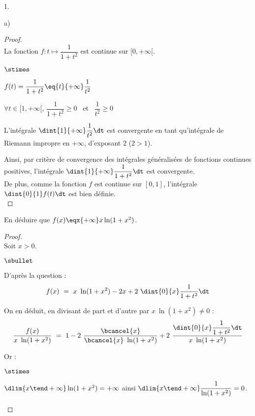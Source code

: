 \begin{noliste}{1.}
\begin{noliste}{a)}
    \begin{proof}~\\%
      La fonction $f : t \mapsto \dfrac{1}{1 + t^2}$ est continue sur
      $[0, +\infty[$.
      \begin{noliste}{$\stimes$}
      \item $f(t) = \dfrac{1}{1 + t^2} \eq{t}{+\infty}
        \dfrac{1}{t^2}$
        
      \item $\forall t \in [1, +\infty[$, $\dfrac{1}{1 + t^2} \geq
        0$ \ et \ $\dfrac{1}{t^2} \geq 0$
        
      \item L'intégrale $\dint{1}{+\infty} \dfrac{1}{t^2} \dt$ est
        convergente en tant qu'intégrale de Riemann impropre en
        $+\infty$, d'exposant $2$ ($2 > 1$).          
      \end{noliste}
      Ainsi, par critère de convergence des intégrales généralisées
      de fonctions continues positives, l'intégrale
      $\dint{1}{+\infty} \dfrac{1}{1+t^2} \dt$ est convergente.\\
      De plus, comme la fonction $f$ est continue sur $[0, 1]$,
      l'intégrale $\dint{0}{1} f(t) \dt$ est bien définie.%
      ~\\[-.8cm]
    \end{proof}
    
  \item En déduire que $f(x) \eqx{+\infty} x \ln(1 + x^2)$.

    \begin{proof}~\\%
      Soit $x > 0$.
      \begin{noliste}{$\sbullet$}
      \item D'après la question  :
        \[
        f(x) \ = \ x \ \ln(1 + x^2) - 2x + 2 \ \dint{0}{x} \dfrac{1}{1
          + t^2} \dt
        \]

      \item On en déduit, en divisant de part et d'autre par $x \
        \ln(1 + x^2) \neq 0$ :
        \[
        \dfrac{f(x)}{x \ \ln(1 + x^2)} \ = \ 1 - 2 \
        \dfrac{\bcancel{x}}{\bcancel{x} \ \ln(1 + x^2)} + 2 \
        \dfrac{\dint{0}{x} \dfrac{1}{1 + t^2} \dt}{x \ \ln(1 + x^2)}
        \]

      \item Or : 
        \begin{noliste}{$\stimes$}
        \item $\dlim{x \tend +\infty} \ln(1 + x^2) = +\infty$ ainsi
          $\dlim{x \tend +\infty} \dfrac{1}{\ln(1 + x^2)} = 0$.


\end{noliste}
\end{noliste}
\end{proof}
\end{noliste}
\end{noliste}
